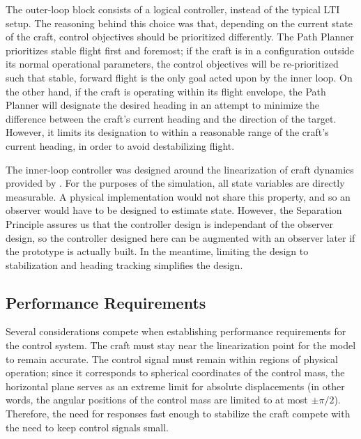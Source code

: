 \documentclass{sydeStyle}
\begin{document}

The outer-loop block consists of a logical controller, instead of the typical
LTI setup.  The reasoning behind this choice was that, depending on the current
state of the craft, control objectives should be prioritized differently.  The
Path Planner prioritizes stable flight first and foremost; if the craft is in a
configuration outside its normal operational parameters, the control objectives
will be re-prioritized such that stable, forward flight is the only goal acted
upon by the inner loop.  On the other hand, if the craft is operating within its
flight envelope, the Path Planner will designate the desired heading in an
attempt to minimize the difference between the craft's current heading and the
direction of the target.  However, it limits its designation to within a
reasonable range of the craft's current heading, in order to avoid destabilizing
flight.


The inner-loop controller was designed around the linearization of craft
dynamics provided by \cite{spottiswoode}.  For the purposes of the simulation,
all state variables are directly measurable.  A physical implementation would
not share this property, and so an observer would have to be designed to
estimate state.  However, the Separation Principle assures us that the
controller design is independant of the observer design, so the controller
designed here can be augmented with an observer later if the prototype is
actually built.  In the meantime, limiting the design to stabilization and
heading tracking simplifies the design.

\subsection{Performance Requirements}

Several considerations compete when establishing performance requirements for
the control system.  The craft must stay near the linearization point for the
model to remain accurate.  The control signal must remain within regions of
physical operation; since it corresponds to spherical coordinates of the control
mass, the horizontal plane serves as an extreme limit for absolute displacements
(in other words, the angular positions of the control mass are limited to at
most $\pm \pi/2$).  Therefore, the need for responses fast enough to stabilize
the craft compete with the need to keep control signals small.
\end{document}
